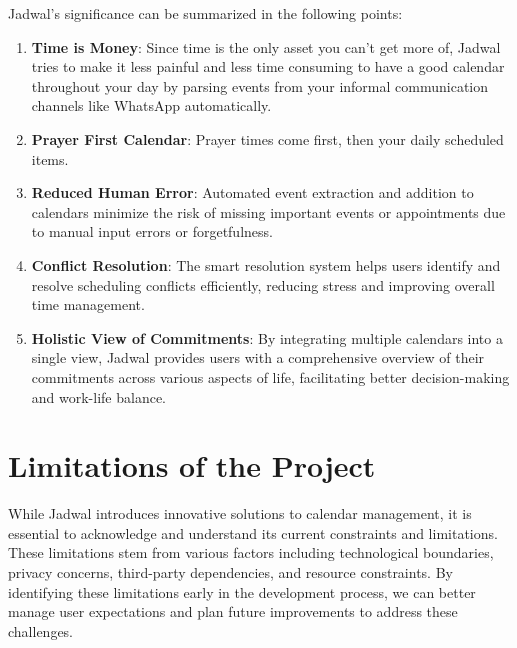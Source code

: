 Jadwal's significance can be summarized in the following points:
\begin{enumerate}
    \item \textbf{Time is Money}: Since time is the only asset you can't get more of, Jadwal tries to make it less painful and less time consuming to have a good calendar throughout your day by parsing events from your informal communication channels like WhatsApp automatically.
    \item \textbf{Prayer First Calendar}: Prayer times come first, then your daily scheduled items.
    \item \textbf{Reduced Human Error}: Automated event extraction and addition to calendars minimize the risk of missing important events or appointments due to manual input errors or forgetfulness.
    \item \textbf{Conflict Resolution}: The smart resolution system helps users identify and resolve scheduling conflicts efficiently, reducing stress and improving overall time management.
    \item \textbf{Holistic View of Commitments}: By integrating multiple calendars into a single view, Jadwal provides users with a comprehensive overview of their commitments across various aspects of life, facilitating better decision-making and work-life balance.
\end{enumerate}

\section{Limitations of the Project}

While Jadwal introduces innovative solutions to calendar management, it is essential to acknowledge and understand its current constraints and limitations. These limitations stem from various factors including technological boundaries, privacy concerns, third-party dependencies, and resource constraints. By identifying these limitations early in the development process, we can better manage user expectations and plan future improvements to address these challenges.


